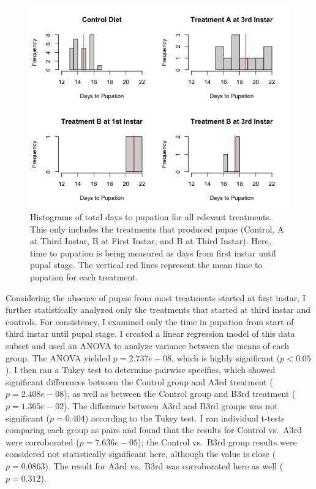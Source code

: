 \documentclass[12pt,]{article}
\begin{document}
\begin{figure}

{\centering \includegraphics[width=0.75\linewidth]{../Figures/Figure_2} 

}

\caption{Histograms of total days to pupation for all relevant treatments. This only includes the treatments that produced pupae (Control, A at Third Instar, B at First Instar, and B at Third Instar). Here, time to pupation is being measured as days from first instar until pupal stage. The vertical red lines represent the mean time to pupation for each treatment.}\label{fig:Figure2}
\end{figure}

Considering the absence of pupae from most treatments started at first
instar, I further statistically analyzed only the treatments that
started at third instar and controls. For consistency, I examined only
the time in pupation from start of third instar until pupal stage. I
created a linear regression model of this data subset and used an ANOVA
to analyze variance between the means of each group. The ANOVA yielded
\(p = 2.737e-08\), which is highly significant (\(p < 0.05\)). I then
ran a Tukey test to determine pairwise specifics, which showed
significant differences between the Control group and A3rd treatment
(\(p = 2.408e-08\)), as well as between the Control group and B3rd
treatment (\(p = 1.365e-02\)). The difference between A3rd and B3rd
groups was not significant (\(p = 0.404\)) according to the Tukey test.
I ran individual t-tests comparing each group as pairs and found that
the results for Control vs.~A3rd were corroborated (\(p = 7.636e-05\));
the Control vs.~B3rd group results were considered not statistically
significant here, although the value is close (\(p = 0.0863\)). The
result for A3rd vs.~B3rd was corroborated here as well (\(p = 0.312\)).
\end{document}
